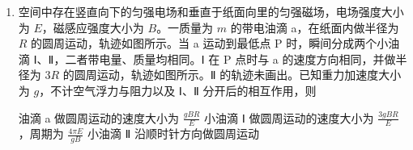 \documentclass[\gkver]{gaokaozhenti}
\begin{document}
\begin{enumerate}
{物块在 $y$ 轴方向受到的力不变为 $mg\sin30^{\circ}$，$x$ 轴方向的力在改变，合力在改变，故物块做的不是匀变速曲线运动，故 A 错误；

B．在 $y$ 轴方向的加速度为

$a_{y} = \frac{mg\sin30^{\circ}}{m} = g\sin30^{\circ} = 5 \Umsq$

故 $t = 1 \Us$ 时，物块的 $y$ 坐标值为

$y = \frac{1}{2}a_{y}t^{2} = 2.5 \Um$

故 B 正确；

C．$t = 1 \Us$ 时，$F = 6 \UN$，故此时加速度大小为

$a = \sqrt{a_{x}^{2} + a_{y}^{2}} = \sqrt{\left(\frac{6}{1.2}\right)^{2} + 5^{2}} \Umsq = 5\sqrt{2} \Umsq$

故 C 错误；

D．对 $x$ 轴正方向，对物块根据动量定理

$Ft = mv_{x} - 0$

由于 $F$ 与时间 $t$ 成线性关系故可得

$\frac{(4 + 2 \times 0) + (4 + 2 \times 2)}{2} \times 2 = 1.2v_{x}$

解得 $v_{x} = 10 \Ums$

此时 $y$ 轴方向速度为

$v_{y} = g\sin30^{\circ} \cdot t = 5 \times 2 \Ums = 10 \Ums$

故此时物块的速度大小为 $v = \sqrt{v_{x}^{2} + v_{y}^{2}} = 10\sqrt{2} \Ums$

故 D 正确。

故选 BD。
}

\item
空间中存在竖直向下的匀强电场和垂直于纸面向里的匀强磁场，电场强度大小为 $E$，磁感应强度大小为 $B$。一质量为 $m$ 的带电油滴 a，在纸面内做半径为 $R$ 的圆周运动，轨迹如图所示。当 a 运动到最低点 P 时，瞬间分成两个小油滴 Ⅰ、Ⅱ，二者带电量、质量均相同。Ⅰ 在 P 点时与 a 的速度方向相同，并做半径为 $3R$ 的圆周运动，轨迹如图所示。Ⅱ 的轨迹未画出。已知重力加速度大小为 $g$，不计空气浮力与阻力以及 Ⅰ、Ⅱ 分开后的相互作用，则


{油滴 a 做圆周运动的速度大小为 $\frac{gBR}{E}$}
{小油滴 Ⅰ 做圆周运动的速度大小为 $\frac{3gBR}{E}$，周期为 $\frac{4\pi E}{gB}$}
{小油滴 Ⅱ 沿顺时针方向做圆周运动}


\end{enumerate}
\end{document}

